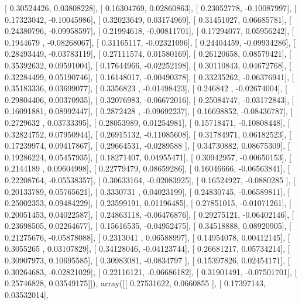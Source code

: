 \documentclass{article}
\begin{document}
       [ 0.30524426,  0.03808228],
       [ 0.16304769,  0.02860863],
       [ 0.23052778, -0.10087997],
       [ 0.17323042, -0.10045986],
       [ 0.32023649,  0.03174969],
       [ 0.31451027,  0.06685781],
       [ 0.24380796, -0.09958597],
       [ 0.21994618, -0.00811701],
       [ 0.17294077,  0.05956242],
       [ 0.1944679 , -0.08268067],
       [ 0.31165117, -0.02321096],
       [ 0.24404459, -0.09934286],
       [ 0.28493449, -0.03783119],
       [ 0.27111574,  0.01580169],
       [ 0.26120658,  0.08579421],
       [ 0.35392632,  0.09591004],
       [ 0.17644966, -0.02252198],
       [ 0.30110843,  0.04672768],
       [ 0.32284499,  0.05190746],
       [ 0.16148017, -0.00490378],
       [ 0.33235262, -0.06376941],
       [ 0.35183336,  0.03699077],
       [ 0.3356823 , -0.01498423],
       [ 0.246842  , -0.02674004],
       [ 0.29804406,  0.00370935],
       [ 0.32076983, -0.06672016],
       [ 0.25084747, -0.03172843],
       [ 0.16091881,  0.08992447],
       [ 0.2872428 , -0.09692237],
       [ 0.16698852, -0.08436787],
       [ 0.2729632 ,  0.03733395],
       [ 0.28053989,  0.01254981],
       [ 0.15718471, -0.10808448],
       [ 0.32824752,  0.07950944],
       [ 0.26915132, -0.11085608],
       [ 0.31784971,  0.06182523],
       [ 0.17239974,  0.09417867],
       [ 0.29664531, -0.0289588 ],
       [ 0.34730882,  0.08675309],
       [ 0.19286224,  0.05457935],
       [ 0.18271407,  0.04955471],
       [ 0.30942957, -0.00650153],
       [ 0.2144189 ,  0.09604998],
       [ 0.22779479,  0.08659286],
       [ 0.16046666, -0.06563841],
       [ 0.22208764, -0.05538357],
       [ 0.30633164, -0.02083925],
       [ 0.16524927, -0.0880285 ],
       [ 0.20133789,  0.05765621],
       [ 0.3330731 ,  0.04023199],
       [ 0.24830745, -0.06589811],
       [ 0.25002353,  0.09484229],
       [ 0.23599191,  0.01196485],
       [ 0.27851015, -0.01071261],
       [ 0.20051453,  0.04022587],
       [ 0.24863118, -0.06476876],
       [ 0.29275121, -0.06402146],
       [ 0.23698505,  0.02264677],
       [ 0.15616535, -0.04952475],
       [ 0.34518888,  0.08920905],
       [ 0.21275676, -0.05878088],
       [ 0.2313041 ,  0.06588997],
       [ 0.14954078,  0.00412145],
       [ 0.3055265 ,  0.03107829],
       [ 0.34128046, -0.04123744],
       [ 0.26681217,  0.05734214],
       [ 0.30907973,  0.10695585],
       [ 0.30983081, -0.0834797 ],
       [ 0.15397826,  0.02454171],
       [ 0.30264683, -0.02821029],
       [ 0.22116121, -0.06686182],
       [ 0.31901491, -0.07501701],
       [ 0.25746828,  0.03549175]]), array([[ 0.27531622,  0.0660855 ],
       [ 0.17397143,  0.03532014],
\end{document}

